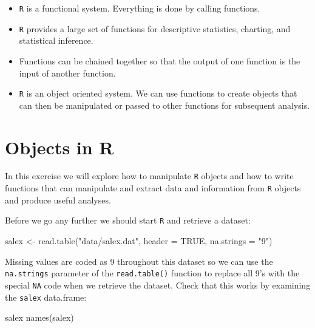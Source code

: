 \documentclass[
  12pt,
]{book}
\newenvironment{Shaded}{\begin{snugshade}}{\end{snugshade}}
\newcommand{\AttributeTok}[1]{\textcolor[rgb]{0.77,0.63,0.00}{#1}}
\newcommand{\ConstantTok}[1]{\textcolor[rgb]{0.00,0.00,0.00}{#1}}
\newcommand{\FunctionTok}[1]{\textcolor[rgb]{0.00,0.00,0.00}{#1}}
\newcommand{\NormalTok}[1]{#1}
\newcommand{\OtherTok}[1]{\textcolor[rgb]{0.56,0.35,0.01}{#1}}
\newcommand{\StringTok}[1]{\textcolor[rgb]{0.31,0.60,0.02}{#1}}
\providecommand{\tightlist}{%
  \setlength{\itemsep}{0pt}\setlength{\parskip}{0pt}}
\begin{document}
\begin{itemize}
\tightlist
\item
  \texttt{R} is a functional system. Everything is done by calling functions.
\item
  \texttt{R} provides a large set of functions for descriptive statistics, charting, and statistical inference.
\item
  Functions can be chained together so that the output of one function is the input of another function.
\item
  \texttt{R} is an object oriented system. We can use functions to create objects that can then be manipulated or passed to other functions for subsequent analysis.
\end{itemize}

\hypertarget{create-manipulate-r}{%
\chapter{Objects in R}\label{create-manipulate-r}}

In this exercise we will explore how to manipulate \texttt{R} objects and how to write functions that can manipulate and extract data and information from \texttt{R} objects and produce useful analyses.

Before we go any further we should start \texttt{R} and retrieve a dataset:

\begin{Shaded}
\begin{Highlighting}[]
\NormalTok{salex }\OtherTok{\textless{}{-}} \FunctionTok{read.table}\NormalTok{(}\StringTok{"data/salex.dat"}\NormalTok{, }\AttributeTok{header =} \ConstantTok{TRUE}\NormalTok{, }\AttributeTok{na.strings =} \StringTok{"9"}\NormalTok{)}
\end{Highlighting}
\end{Shaded}

Missing values are coded as 9 throughout this dataset so we can use the \texttt{na.strings} parameter of the \texttt{read.table()} function to replace all 9's with the special \texttt{NA} code when we retrieve the dataset. Check that this works by examining the \texttt{salex} data.frame:

\begin{Shaded}
\begin{Highlighting}[]
\NormalTok{salex}
\FunctionTok{names}\NormalTok{(salex)}
\end{Highlighting}
\end{Shaded}
\end{document}
